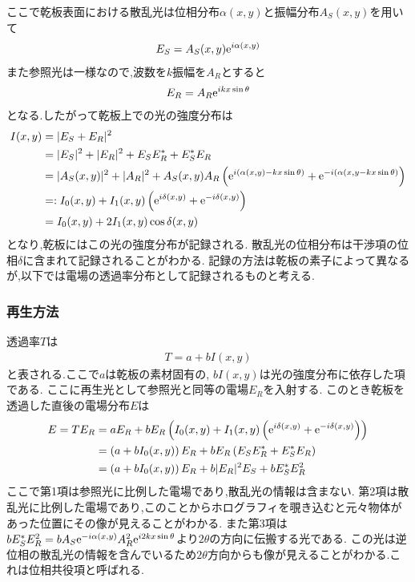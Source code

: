 ここで乾板表面における散乱光は位相分布$\alpha(x,y)$と振幅分布$A_S(x,y)$を用いて
\begin{align}
  E_S=A_S(x,y){\rm e}^{i\alpha(x,y)}
\end{align}
また参照光は一様なので,波数を$k$振幅を$A_R$とすると
\begin{align}
  E_R=A_R{\rm e}^{ikx\sin\theta}
\end{align}
となる.したがって乾板上での光の強度分布は
\begin{align}
  \begin{split}
    I(x,y)&=|E_S+E_R|^2\\
    &=|E_S|^2+|E_R|^2+E_SE_R^*+E_S^*E_R\\
    &=|A_S(x,y)|^2+|A_R|^2+A_S(x,y)A_R\left({\rm e}^{i(\alpha(x,y)-kx\sin\theta)}+{\rm e}^{-i(\alpha(x,y-kx\sin\theta)}\right)\\
    &=:I_0(x,y)+I_1(x,y)\left({\rm e}^{i\delta(x,y)}+{\rm e}^{-i\delta(x,y)}\right)\\
    &=I_0(x,y)+2I_1(x,y)\cos\delta(x,y)
  \end{split}
\end{align}
となり,乾板にはこの光の強度分布が記録される.
散乱光の位相分布は干渉項の位相$\delta$に含まれて記録されることがわかる.
記録の方法は乾板の素子によって異なるが,以下では電場の透過率分布として記録されるものと考える.
\subsubsection{再生方法}
透過率$T$は
\begin{align}
  T=a+bI(x,y)
\end{align}
と表される.ここで$a$は乾板の素材固有の,
$bI(x,y)$は光の強度分布に依存した項である.
ここに再生光として参照光と同等の電場$E_R$を入射する.
このとき乾板を透過した直後の電場分布$E$は
\begin{align}
  \begin{split}  
    E=TE_R&=aE_R+bE_R\left(I_0(x,y)+I_1(x,y)\left({\rm e}^{i\delta(x,y)}+{\rm e}^{-i\delta(x,y)}\right)\right)\\
    &=\left(a+bI_0(x,y)\right)E_R+bE_R\left(E_SE_R^*+E_S^*E_R\right)\\
    &=\left(a+bI_0(x,y)\right)E_R+b|E_R|^2E_S+bE_S^*E_R^2
  \end{split}
\end{align}
ここで第1項は参照光に比例した電場であり,散乱光の情報は含まない.
第2項は散乱光に比例した電場であり,このことからホログラフィを覗き込むと元々物体があった位置にその像が見えることがわかる.
また第3項は$bE_S^*E_R^2=bA_S{\rm e}^{-i\alpha(x,y)}A_R^2{\rm e}^{i2kx\sin\theta}$より$2\theta$の方向に伝搬する光である.
この光は逆位相の散乱光の情報を含んでいるため$2\theta$方向からも像が見えることがわかる.これは位相共役項と呼ばれる.
